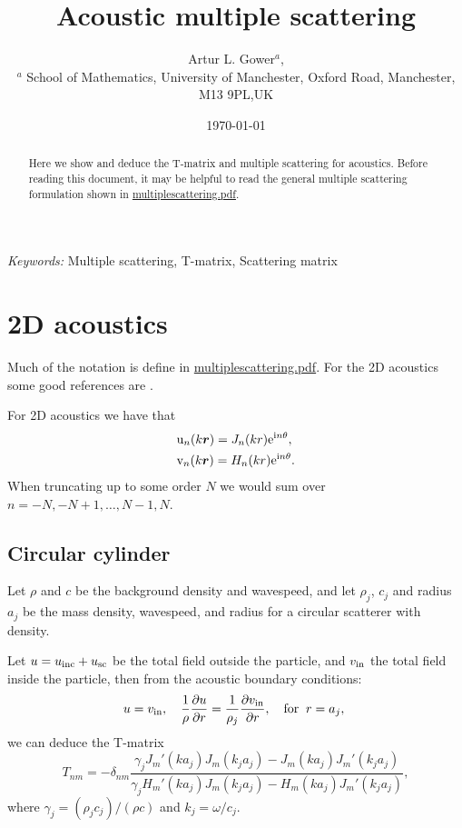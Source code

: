 \documentclass[ 12pt, a4paper]{article}
\begin{document}
\title{Acoustic multiple scattering}
\author{
Artur L. Gower$^{a}$,\\
\footnotesize{$^{a}$ School of Mathematics, University of Manchester, Oxford Road, Manchester, M13 9PL,UK}
}
\date{\today}
\maketitle

\begin{abstract}
Here we show and deduce the T-matrix and multiple scattering for acoustics. Before reading this document, it may be helpful to read the general multiple scattering formulation shown in \href{multiplescattering.pdf}{multiplescattering.pdf}.
\end{abstract}

\noindent
{\textit{Keywords:} Multiple scattering, T-matrix, Scattering matrix}

\section{2D acoustics}
Much of the notation is define in \href{multiplescattering.pdf}{multiplescattering.pdf}. For the 2D acoustics some good references are \parencite{ganesh_far-field_2010,ganesh_algorithm_2017}.

For 2D acoustics we have that
\begin{align}
  & \mathrm u_{n}(k\boldsymbol{r}) = J_{n}(k r) \mathrm{e}^{\mathrm{i} n \theta},
  \\
  & \mathrm v_{n}(k\boldsymbol{r})= H_{n}(k r) \mathrm{e}^{\mathrm{i} n \theta}.
\end{align}
When truncating up to some order $N$ we would sum over $n = -N, -N +1, \ldots, N-1, N$.


\subsection{Circular cylinder}
Let $\rho$ and $c$ be the background density and wavespeed, and let $\rho_j$, $c_j$ and radius $a_j$ be the mass density, wavespeed, and radius for a circular scatterer with density.

Let $u = u_{\mathrm{inc}} + u_{\mathrm{sc}}$ be the total field outside the particle, and $v_{\mathrm{in}}$ the total field inside the particle, then from the acoustic boundary conditions:
\[
u = v_{\mathrm{in}}, \quad \frac{1}{\rho} \frac{\partial u}{\partial r} = \frac{1}{\rho_j} \frac{\partial v_{\mathrm{in}}}{\partial r}, \quad \text{for} \;\; r = a_j,\
\]
we can deduce the T-matrix
\begin{equation}
  T_{nm} = - \delta_{nm} \frac{\gamma_j J_m' (k a_j) J_m (k_j a_j) - J_m (k a_j) J_m' (k_j a_j) }{\gamma_j H_m '(k a_j) J_m(k_j a_j) - H_m(k a_j) J_m '(k_j a_j)},
  \label{eqn:circular_t-matrix}
\end{equation}
where $\gamma_j = (\rho_j c_j)/(\rho c)$ and $k_j = \omega/c_j$.
\end{document}

